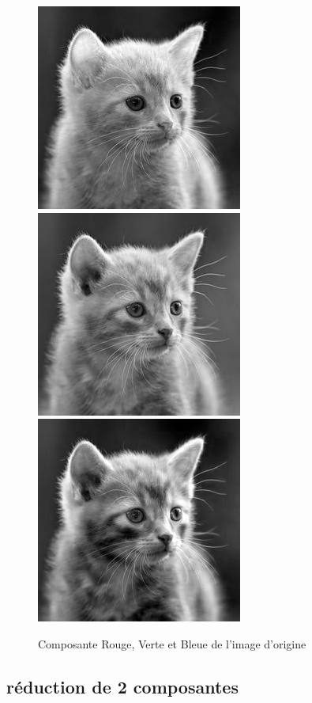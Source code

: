 \documentclass{article}
\begin{document}
\begin{figure}[h]
\centerline{\includegraphics[scale=0.7]{./rendus/Red.png} \includegraphics[scale=0.7]{./rendus/Green.png} \includegraphics[scale=0.7]{./rendus/Blue.png} }
\caption{Composante Rouge, Verte et Bleue de l'image d'origine}
\end{figure}

\newpage
\subsection{réduction de 2 composantes}
\end{document}
